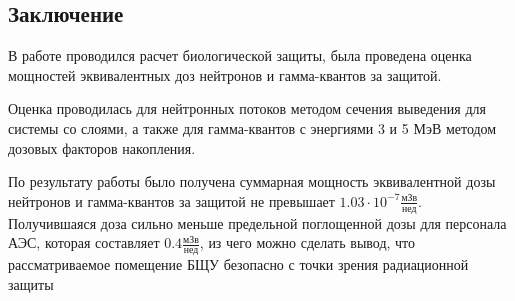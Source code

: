 \subsection{Заключение}
В работе проводился расчет биологической защиты, была проведена оценка мощностей эквивалентных доз нейтронов и гамма-квантов за защитой.

Оценка проводилась для нейтронных потоков методом сечения выведения для системы со слоями, а также для гамма-квантов с энергиями 3 и 5 МэВ методом дозовых факторов накопления.

По результату работы было получена суммарная мощность эквивалентной дозы нейтронов и гамма-квантов за защитой не превышает $1.03 \cdot 10^{- 7} \frac{\text{мЗв}}{\text{нед}}$. Получившаяся доза сильно меньше предельной поглощенной дозы для персонала АЭС, которая составляет $0.4 \frac{\text{мЗв}}{\text{нед}}$, из чего можно сделать вывод, что рассматриваемое помещение БЩУ безопасно с точки зрения радиационной защиты

